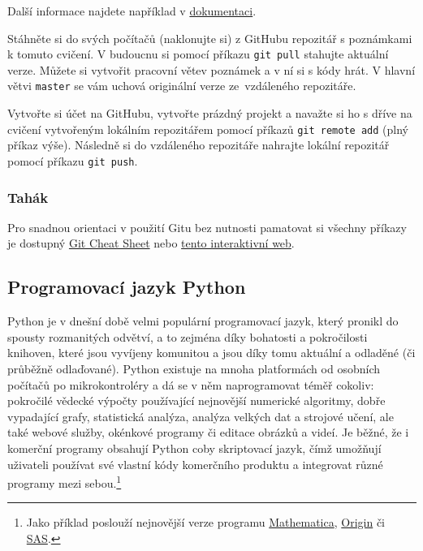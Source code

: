 \documentclass[a4paper,11pt,twoside]{article}
\def\code#1{\textnormal{\texttt{#1}}}
\theoremstyle{red}
\theoremstyle{green}
\begin{document}
    Další informace najdete například v \href{https://git-scm.com/book/cs/v2/Z%C3%A1klady-pr%C3%A1ce-se-syst%C3%A9mem-Git-Pr%C3%A1ce-se-vzd%C3%A1len%C3%BDmi-repozit%C3%A1%C5%99i}{dokumentaci}.

    \begin{voluntary}
        Stáhněte si do svých počítačů (naklonujte si) z GitHubu repozitář s poznámkami k tomuto cvičení.
        V budoucnu si pomocí příkazu \code{git pull} stahujte aktuální verze.
        Můžete si vytvořit pracovní větev poznámek a v ní si s kódy hrát.
        V hlavní větvi \code{master} se vám uchová originální verze ze~vzdáleného repozitáře.
    \end{voluntary}

    \begin{voluntary}
        Vytvořte si účet na GitHubu, vytvořte prázdný projekt a navažte si ho s dříve na cvičení vytvořeným lokálním repozitářem pomocí příkazů \code{git remote add} (plný příkaz výše).
        Následně si do vzdáleného repozitáře nahrajte lokální repozitář pomocí příkazu \code{git push}. 
    \end{voluntary}

\subsubsection{Tahák}
    Pro snadnou orientaci v použití Gitu bez nutnosti pamatovat si všechny příkazy je dostupný \href{https://training.github.com/downloads/github-git-cheat-sheet.pdf}{Git Cheat Sheet} nebo \href{https://ndpsoftware.com/git-cheatsheet.html}{tento interaktivní web}.

\subsection{Programovací jazyk Python}
    Python je v dnešní době velmi populární programovací jazyk, který pronikl do spousty rozmanitých odvětví, a to zejména díky bohatosti a pokročilosti knihoven, které jsou vyvíjeny komunitou a jsou díky tomu aktuální a odladěné (či průběžně odlaďované).
    Python existuje na mnoha platformách od osobních počítačů po mikrokontroléry a dá se v něm naprogramovat téměř cokoliv: pokročilé vědecké výpočty používající nejnovější numerické algoritmy, dobře vypadající grafy, statistická analýza, analýza velkých dat a strojové učení, ale také webové služby, okénkové programy či editace obrázků a videí.
    Je běžné, že i komerční programy obsahují Python coby skriptovací jazyk, čímž umožňují uživateli používat své vlastní kódy  komerčního produktu a integrovat různé programy mezi sebou.\footnote{
        Jako příklad poslouží nejnovější verze programu \href{https://www.wolfram.com/language/12/external-system-integration/evaluate-python-in-a-notebook.html}{Mathematica}, \href{https://www.originlab.com/doc/python/Run-Python-in-Origin}{Origin} či \href{https://developer.sas.com/guides/python.html}{SAS}.
    }
    
\end{document}
